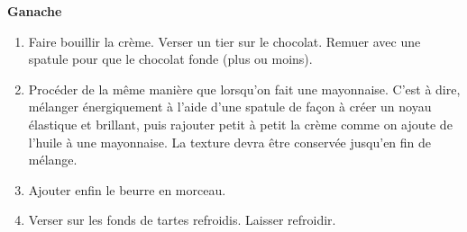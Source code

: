 \textbf{Ganache}

\begin{ingredients}
\end{ingredients}


\begin{recipe}
  \begin{enumerate}

  \item Faire bouillir la cr\`eme.  Verser un tier sur le chocolat.
    Remuer avec une spatule pour que le chocolat fonde (plus ou moins).

  \item Proc\'eder de la m\^eme mani\`ere que lorsqu'on fait une
    mayonnaise.  C'est \`a dire, m\'elanger \'energiquement \`a l'aide
    d'une spatule de fa\c{c}on \`a cr\'eer un noyau \'elastique et
    brillant, puis rajouter petit \`a petit la cr\`eme comme on ajoute
    de l'huile \`a une mayonnaise.  La texture devra \^etre
    conserv\'ee jusqu'en fin de m\'elange.

  \item Ajouter enfin le beurre en morceau.

  \item Verser sur les fonds de tartes refroidis.  Laisser refroidir.

  \end{enumerate}
\end{recipe}
